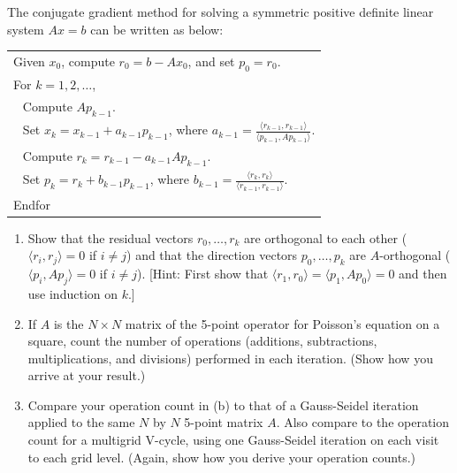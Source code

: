 \documentclass[10pt]{article}
\begin{document}
\maketitle


\begin{problem}[Problem 1]
The conjugate gradient method for solving a symmetric positive definite linear system
\( Ax=b \) can be written as below:
\vspace{.1in}

\begin{center}
\begin{tabular}{|l|} \hline
Given \( x_0 \), compute \( r_0 = b - A x_0 \), and set \( p_0 = r_0 \). \\
For \( k=1,2, \ldots \), \\
\( ~~ \) Compute \( A p_{k-1} \). \\
\( ~~ \) Set \( x_k = x_{k-1} + a_{k-1} p_{k-1} \), where $a_{k-1} = \frac{\langle r_{k-1} , r_{k-1} \rangle}
{\langle p_{k-1} , A p_{k-1} \rangle}$. \\
\( ~~ \) Compute \( r_k = r_{k-1} - a_{k-1} A p_{k-1} \). \\
\( ~~ \) Set \( p_k = r_k + b_{k-1} p_{k-1} \), where $b_{k-1} = \frac{\langle r_k , r_k \rangle}
{\langle r_{k-1} , r_{k-1} \rangle}$. \\
Endfor \\ \hline
\end{tabular}
\end{center}
\vspace{.1in}

\begin{enumerate}[label=(\alph*)]
\item
Show that the residual vectors \( r_0 , \ldots , r_k \) are orthogonal to each other (\( \langle r_i , r_j \rangle = 0 \) if \( i \neq j \)) and that the direction vectors  \( p_0 , \ldots , p_k \) are \( A \)-orthogonal (\( \langle p_i , A p_j \rangle = 0 \) if \( i \neq j \)).
[Hint:  First show that \( \langle r_1 , r_0 \rangle = \langle p_1 , A p_0 \rangle = 0 \) and then use induction on \( k \).]

\item
If \( A \) is the \( N \times N \) matrix of the 5-point operator for Poisson's equation on a square, count the number of operations (additions, subtractions, multiplications, and divisions) performed in each iteration.  (Show how you arrive at your result.)

\item
Compare your operation count in (b) to that of a Gauss-Seidel iteration applied to the same \( N \) by \( N \) 5-point matrix \( A \).  Also compare to the operation count for a multigrid V-cycle, using one Gauss-Seidel iteration on each visit to each grid level.
(Again, show how you derive your operation counts.)
\end{enumerate}
\end{problem}
\end{document}
